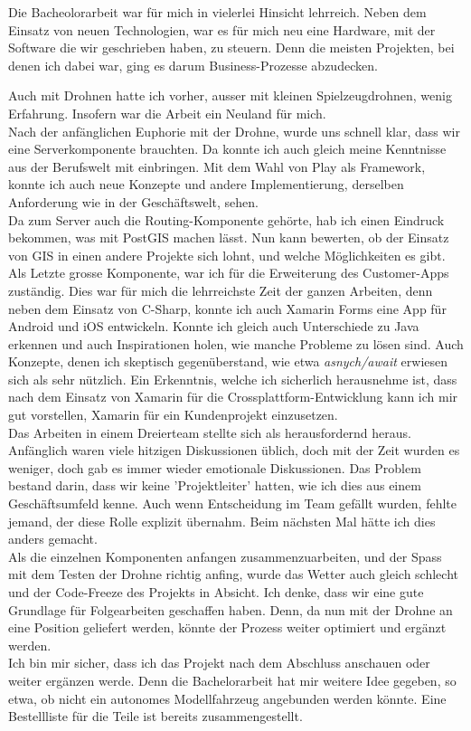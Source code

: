 Die Bacheolorarbeit war für mich in vielerlei Hinsicht lehrreich. 
Neben dem Einsatz von neuen Technologien, war es für mich neu eine Hardware, mit der Software die wir geschrieben haben, zu steuern.
Denn die meisten Projekten, bei denen ich dabei war, ging es darum Business-Prozesse abzudecken.

Auch mit Drohnen hatte ich vorher, ausser mit kleinen Spielzeugdrohnen, wenig Erfahrung. Insofern war die Arbeit ein Neuland für mich.
\\

Nach der anfänglichen Euphorie mit der Drohne, wurde uns schnell klar, dass wir eine Serverkomponente brauchten. Da konnte ich auch gleich meine Kenntnisse aus der Berufswelt mit einbringen. 
Mit dem Wahl von Play als Framework, konnte ich auch neue Konzepte und andere Implementierung, derselben Anforderung wie in der Geschäftswelt, sehen. 
\\

Da zum Server auch die Routing-Komponente gehörte, hab ich einen Eindruck bekommen, was mit PostGIS machen lässt. Nun kann bewerten, ob der Einsatz von GIS in einen andere Projekte sich lohnt, und welche Möglichkeiten es gibt. 
\\
Als Letzte grosse Komponente, war ich für die Erweiterung des Customer-Apps zuständig. Dies war für mich die lehrreichste Zeit der ganzen Arbeiten, denn neben dem Einsatz von C-Sharp, konnte ich auch Xamarin Forms eine App für Android und iOS entwickeln. Konnte ich gleich auch Unterschiede zu Java erkennen und auch Inspirationen holen, wie manche Probleme zu lösen sind. Auch Konzepte, denen ich skeptisch gegenüberstand, wie etwa \textit{asnych/await} erwiesen sich als sehr nützlich. Ein Erkenntnis, welche ich sicherlich herausnehme ist, dass nach dem Einsatz von Xamarin für die Crossplattform-Entwicklung kann ich mir gut vorstellen, Xamarin für ein Kundenprojekt einzusetzen. 
\\

Das Arbeiten in einem Dreierteam stellte sich als herausfordernd heraus. Anfänglich waren viele hitzigen Diskussionen üblich, doch mit der Zeit wurden es weniger, doch gab es immer wieder emotionale Diskussionen. Das Problem bestand darin, dass wir keine 'Projektleiter' hatten, wie ich dies aus einem Geschäftsumfeld kenne. Auch wenn Entscheidung im Team gefällt wurden, fehlte jemand, der diese Rolle explizit übernahm. Beim nächsten Mal hätte ich dies anders gemacht.
\\
 
Als die einzelnen Komponenten anfangen zusammenzuarbeiten, und der Spass mit dem Testen der Drohne richtig anfing, wurde das Wetter auch gleich schlecht und der Code-Freeze des Projekts in Absicht. Ich denke, dass wir eine gute Grundlage für Folgearbeiten geschaffen haben. Denn, da nun mit der Drohne an eine Position geliefert werden, könnte der Prozess weiter optimiert und ergänzt werden. 
\\

Ich bin mir sicher, dass ich das Projekt nach dem Abschluss anschauen oder weiter ergänzen werde. Denn die Bachelorarbeit hat mir weitere Idee gegeben, so etwa, ob nicht ein autonomes Modellfahrzeug angebunden werden könnte. Eine Bestellliste für die Teile ist bereits zusammengestellt.




